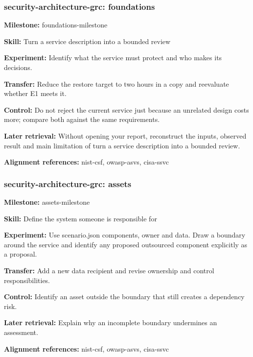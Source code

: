 \subsubsection{security-architecture-grc: foundations}
\noindent\textbf{Milestone:} foundations-milestone\par
\noindent\textbf{Skill:} Turn a service description into a bounded review\par
\noindent\textbf{Experiment:} Identify what the service must protect and who makes its decisions.\par
\noindent\textbf{Transfer:} Reduce the restore target to two hours in a copy and reevaluate whether E1 meets it.\par
\noindent\textbf{Control:} Do not reject the current service just because an unrelated design costs more; compare both against the same requirements.\par
\noindent\textbf{Later retrieval:} Without opening your report, reconstruct the inputs, observed result and main limitation of turn a service description into a bounded review.\par
\noindent\textbf{Alignment references:} nist-csf, owasp-asvs, cisa-ssvc\par
\subsubsection{security-architecture-grc: assets}
\noindent\textbf{Milestone:} assets-milestone\par
\noindent\textbf{Skill:} Define the system someone is responsible for\par
\noindent\textbf{Experiment:} Use scenario.json components, owner and data. Draw a boundary around the service and identify any proposed outsourced component explicitly as a proposal.\par
\noindent\textbf{Transfer:} Add a new data recipient and revise ownership and control responsibilities.\par
\noindent\textbf{Control:} Identify an asset outside the boundary that still creates a dependency risk.\par
\noindent\textbf{Later retrieval:} Explain why an incomplete boundary undermines an assessment.\par
\noindent\textbf{Alignment references:} nist-csf, owasp-asvs, cisa-ssvc\par
